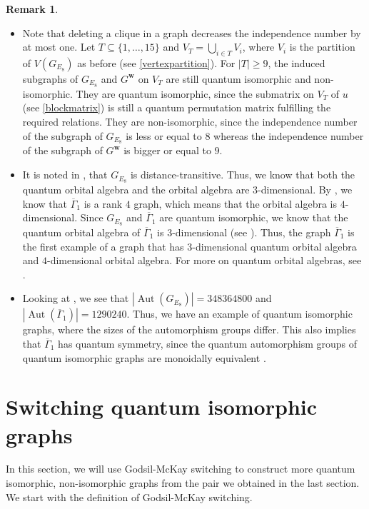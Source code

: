 \documentclass[11pt]{article}
\theoremstyle{definition}
\newtheorem{rema}[theo]{Remark}
\numberwithin{equation}{section}
\DeclareMathOperator{\aut}{Aut}
\begin{document}
\begin{rema}\label{remqiso}
\ \begin{itemize}
\item[(i)] Note that deleting a clique in a graph decreases the independence number by at most one. Let $T\subseteq \{1,\dots, 15\}$ and $V_T=\bigcup_{i\in T}V_i$, where $V_i$ is the partition of $V(G_{E_8})$ as before (see \eqref{vertexpartition}). For $|T|\geq 9$, the induced subgraphs of $G_{E_8}$ and $G^{\boldsymbol{w}}$ on $V_T$ are still quantum isomorphic and non-isomorphic. They are quantum isomorphic, since the submatrix on $V_T$ of $u$ (see \eqref{blockmatrix})  is still a quantum permutation matrix fulfilling the required relations. They are non-isomorphic, since the independence number of the subgraph of $G_{E_8}$ is less or equal to $8$ whereas the independence number of the subgraph of $G^{\boldsymbol{w}}$ is bigger or equal to $9$. 
\item[(ii)] It is noted in \cite[Section 10.39]{BVM}, that $G_{E_8}$ is distance-transitive. Thus, we know that both the quantum orbital algebra and the orbital algebra are $3$-dimensional. By \cite{BIK}, we know that $\overline{\Gamma}_1$ is a rank $4$ graph, which means that the orbital algebra is $4$-dimensional. Since $G_{E_8}$ and $\overline{\Gamma}_1$ are quantum isomorphic, we know that the quantum orbital algebra of $\overline{\Gamma}_1$ is $3$-dimensional (see \cite[Theorem 4.6]{LMR}). Thus, the graph $\overline{\Gamma}_1$ is the first example of a graph that has $3$-dimensional quantum orbital algebra and $4$-dimensional orbital algebra. For more on quantum orbital algebras, see \cite{LMR}. 
\item[(iii)] Looking at \cite[Table 2.2]{MS}, we see that $|\aut(G_{E_8})|=348364800$ and $|\aut(\overline{\Gamma}_1)|=1290240$. Thus, we have an example of quantum isomorphic graphs, where the sizes of the automorphism groups differ. This also implies that $\overline{\Gamma}_1$ has quantum symmetry, since the quantum automorphism groups of quantum isomorphic graphs are monoidally equivalent \cite[Theorem 4.7]{BCEHPSW}.
\end{itemize}
\end{rema}

\section{Switching quantum isomorphic graphs}\label{secswitching}

In this section, we will use Godsil-McKay switching to construct more quantum isomorphic, non-isomorphic graphs from the pair we obtained in the last section. We start with the definition of Godsil-McKay switching.
\end{document}

